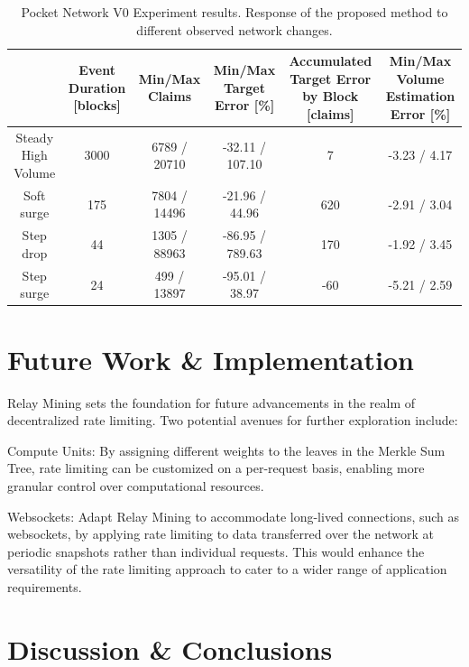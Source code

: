 \documentclass[runningheads]{llncs}
\begin{document}
\begin{table}
    \caption{Pocket Network V0 Experiment results. Response of the proposed method to different observed network changes.}\label{table:v0tests}
    \begin{tabularx}{\textwidth}{|C|C|C|C|C|C|}
    \hline
        &  Event Duration [blocks] & Min/Max Claims & Min/Max Target Error [\%] & Accumulated Target Error by Block [claims] & Min/Max Volume Estimation Error [\%] \\
    \hline
        Steady High Volume  & 3000 & 6789 / 20710 & -32.11 / 107.10 &   7 & -3.23 / 4.17 \\
        Soft surge          &  175 & 7804 / 14496 & -21.96 / 44.96  & 620 & -2.91 / 3.04 \\
        Step drop           &   44 & 1305 / 88963 & -86.95 / 789.63 & 170 & -1.92 / 3.45 \\
        Step surge          &   24 &  499 / 13897 & -95.01 / 38.97  & -60 & -5.21 / 2.59 \\
    \hline
\end{tabularx}
\end{table}


\section{Future Work \& Implementation}

Relay Mining sets the foundation for future advancements in the realm of decentralized rate limiting. Two potential avenues for further exploration include:

Compute Units: By assigning different weights to the leaves in the Merkle Sum Tree, rate limiting can be customized on a per-request basis, enabling more granular control over computational resources.

Websockets: Adapt Relay Mining to accommodate long-lived connections, such as websockets, by applying rate limiting to data transferred over the network at periodic snapshots rather than individual requests. This would enhance the versatility of the rate limiting approach to cater to a wider range of application requirements.

\section{Discussion \& Conclusions}
\end{document}
